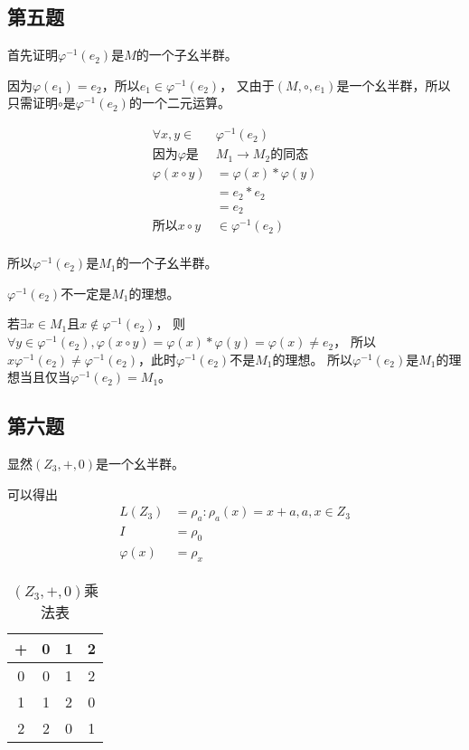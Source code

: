 \documentclass[12pt,onecolumn]{article}
\theoremstyle{plain}
\begin{document}
\subsection{第五题}
首先证明$\varphi^{-1}(e_2)$是$M$的一个子幺半群。

\begin{proof*}
  因为$\varphi(e_1) = e_2$，所以$e_1 \in \varphi^{-1}(e_2)$，
  又由于$(M,\circ,e_1)$是一个幺半群，所以只需证明$\circ$是$\varphi^{-1}(e_2)$的一个二元运算。

  \begin{align*}
    \forall x, y \in& \varphi^{-1}(e_2) \\
    \text{因为} \varphi\text{是}&M_1 \rightarrow M_2 \text{的同态} \\
    \varphi(x \circ y) &= \varphi(x) * \varphi(y) \\
            &= e_2* e_2 \\
            &= e_2 \\
    \text{所以} x \circ y& \in \varphi^{-1}(e_2) \\
  \end{align*}

  所以$\varphi^{-1}(e_2)$是$M_1$的一个子幺半群。
\end{proof*}

$\varphi^{-1}(e_2)$不一定是$M_1$的理想。

若$\exists x \in M_1$且$x \notin \varphi^{-1}(e_2)$，
则$\forall y \in \varphi^{-1}(e_2), \varphi(x \circ y) = \varphi(x) * \varphi(y) = \varphi(x) \neq e_2$，
所以$ x\varphi^{-1}(e_2) \neq \varphi^{-1}(e_2)$，此时$\varphi^{-1}(e_2)$不是$M_1$的理想。
所以$\varphi^{-1}(e_2)$是$M_1$的理想当且仅当$\varphi^{-1}(e_2)=M_1$。


\subsection{第六题}
显然$(Z_3,+,0)$是一个幺半群。

可以得出
\begin{align*}
  L(Z_3) &= {\rho_a:\rho_a(x) = x + a, a, x \in Z_3} \\
  I &= \rho_0 \\
  \varphi(x) &= \rho_x
\end{align*}

\begin{table*}[h]
  \centering
  \begin{tabular}{|c|c|c|c|}
    \toprule
    + & 0 & 1 & 2 \\
    \midrule
    0 & 0 & 1 & 2 \\
    \midrule
    1 & 1 & 2 & 0 \\
    \midrule
    2 & 2 & 0 & 1 \\
    \bottomrule
  \end{tabular}
  \caption{$(Z_3,+,0)$乘法表}
\end{table*}
\end{document}
